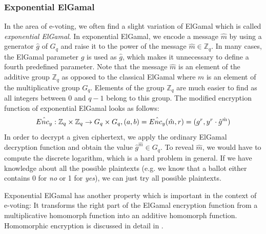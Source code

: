 \documentclass[numbers=noenddot, abstract=on, a4paper, headsepline,
footsepline, oneside, draft=off]{scrreprt}
\begin{document}
\subsubsection{Exponential ElGamal}
\label{sec:expelgamal}
In the area of e-voting, we often find a slight variation of ElGamal which is
called \emph{exponential ElGamal}. In exponential ElGamal, we encode a message
$\hat{m}$ by using a generator $\hat{g}$ of $G_q$ and raise it to the power of
the message $\hat{m} \in \mathbb{Z}_q$. In many cases, the ElGamal parameter $g$
is used as $\hat{g}$, which makes it unnecessary to define a fourth predefined
parameter. Note that the message $\hat{m}$ is an element of the additive group
$\mathbb{Z}_q$ as opposed to the classical ElGamal where $m$ is an element of
the multiplicative group $G_q$. Elements of the group $\mathbb{Z}_q$ are much
easier to find as all integers between $0$ and $q-1$ belong to this group. The
modified encryption function of exponential ElGamal looks as follows:
\begin{equation}
\hat{Enc_y} : \mathbb{Z}_q \times \mathbb{Z}_q \rightarrow G_q \times G_q,
(a, b)=\hat{Enc_y}(\hat{m}, r)=(g^r, y^r \cdot \hat{g}^{\hat{m}}) \notag
\end{equation}
In order to decrypt a given ciphertext, we apply the ordinary ElGamal decryption
function and obtain the value $\hat{g}^{\hat{m}} \in G_q$. To reveal $\hat{m}$,
we would have to compute the discrete logarithm, which is a hard problem in
general. If we have knowledge about all the possible plaintexts (e.g. we know
that a ballot either contains 0 for \emph{no} or 1 for \emph{yes}), we can just try all
possible plaintexts. 

Exponential ElGamal has another property which is important in the context of
e-voting: It transforms the right part of the ElGamal encryption function from a
multiplicative homomorph function into an additive homomorph function.
Homomorphic encryption is discussed in detail in .
\end{document}

